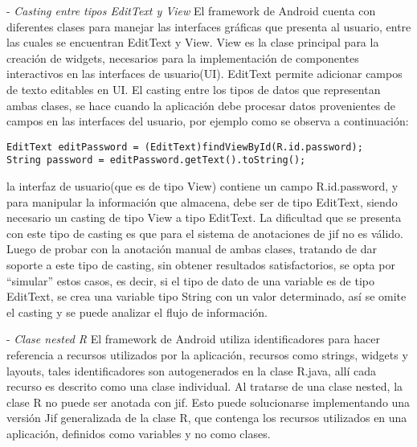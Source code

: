 - \textit{Casting entre tipos EditText y View}\newline
El framework de Android cuenta con diferentes clases para manejar las interfaces
gráficas que presenta al usuario, entre las cuales se encuentran EditText y
View. View es la clase principal para la creación de widgets, necesarios para la
implementación de componentes interactivos en las interfaces de usuario(UI).
EditText permite adicionar campos de texto editables en UI. El casting entre los
tipos de datos que representan ambas clases, se hace cuando la aplicación debe
procesar datos provenientes de campos en las interfaces del usuario, por ejemplo
como se observa a continuación:
\begin{lstlisting}
EditText editPassword = (EditText)findViewById(R.id.password);
String password = editPassword.getText().toString();
\end{lstlisting}
la interfaz de usuario(que es de tipo View) contiene un campo R.id.password, y
para manipular la información que almacena, debe ser de tipo EditText, siendo
necesario un casting de tipo View a tipo EditText. La dificultad que se presenta
con este tipo de casting es que para el sistema de anotaciones de jif no es
válido. Luego de probar con la anotación manual de ambas clases, tratando de
dar soporte a este tipo de casting, sin obtener resultados satisfactorios, se
opta por ``simular'' estos casos, es decir, si el tipo de dato de una variable
es de tipo EditText, se crea una variable tipo String con un valor determinado,
así se omite el casting y se puede analizar el flujo de información.

- \textit{Clase nested R}\newline
El framework de Android utiliza identificadores para hacer referencia a recursos
utilizados por la aplicación, recursos como strings, widgets y layouts, tales
identificadores son autogenerados en la clase R.java, allí cada recurso es
descrito como una clase individual. Al tratarse de una clase nested, la clase R
no puede ser anotada con jif. Esto puede solucionarse implementando una
versión Jif generalizada de la clase R, que contenga los recursos utilizados en
una aplicación, definidos como variables y no como clases. 


